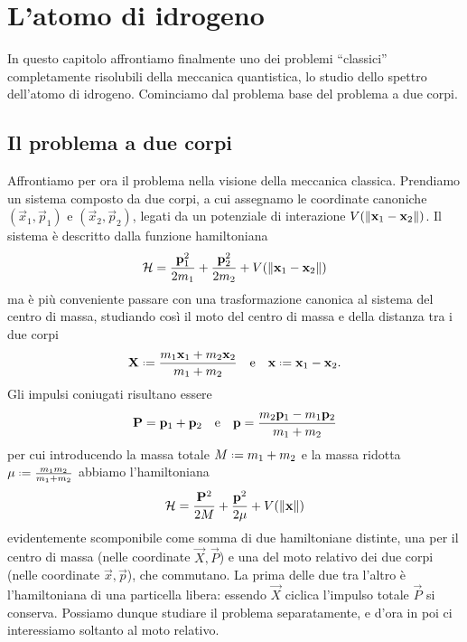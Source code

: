 \chapter{L'atomo di idrogeno}
In questo capitolo affrontiamo finalmente uno dei problemi ``classici'' completamente risolubili della meccanica quantistica, lo studio dello spettro dell'atomo di idrogeno.
Cominciamo dal problema base del problema a due corpi.

\section{Il problema a due corpi}
Affrontiamo per ora il problema nella visione della meccanica classica.
Prendiamo un sistema composto da due corpi, a cui assegnamo le coordinate canoniche $(\vec x_1,\vec p_1)$ e $(\vec x_2,\vec p_2)$, legati da un potenziale di interazione $V(\left\|{\mathbf{x}_1-\mathbf{x}_2}\right\|)$.
Il sistema è descritto dalla funzione hamiltoniana
\begin{equation}
	\mathcal H=\frac{\mathbf{p}_1^2}{2m_1}+\frac{\mathbf{p}_2^2}{2m_2}+V(\left\|{\mathbf{x}_1-\mathbf{x}_2}\right\|)
	\label{eq:hamiltoniana-due-corpi}
\end{equation}
ma è più conveniente passare con una trasformazione canonica al sistema del centro di massa, studiando cos\`i il moto del centro di massa e della distanza tra i due corpi
\begin{equation}
	\vec X\defeq\frac{m_1\vec x_1+m_2\vec x_2}{m_1+m_2}\qeq\vec x\defeq\vec x_1-\vec x_2.
	\label{eq:coordinate-moto-relativo}
\end{equation}
Gli impulsi coniugati risultano essere
\begin{equation}
	\mathbf{P}=\mathbf{p}_1+\mathbf{p}_2\quad\text{e}\quad\mathbf{p}=\frac{m_2\mathbf{p}_1-m_1\mathbf{p}_2}{m_1+m_2}
	\label{eq:impulsi-moto-relativo}
\end{equation}
per cui introducendo la massa totale $M\defeq m_1+m_2$ e la massa ridotta $\mu\defeq\frac{m_1m_2}{m_1+m_2}$ abbiamo l'hamiltoniana
\begin{equation}
	\mathcal H=\frac{\mathbf{P}^2}{2M}+\frac{\mathbf{p}^2}{2\mu}+V(\left\|{\mathbf{x}}\right\|)
	\label{eq:hamiltoniana-moto-relativo}
\end{equation}
evidentemente scomponibile come somma di due hamiltoniane distinte, una per il centro di massa (nelle coordinate $\vec X,\vec P$) e una del moto relativo dei due corpi (nelle coordinate $\vec x,\vec p$), che commutano.
La prima delle due tra l'altro è l'hamiltoniana di una particella libera: essendo $\vec X$ ciclica l'impulso totale $\vec P$ si conserva.
Possiamo dunque studiare il problema separatamente, e d'ora in poi ci interessiamo soltanto al moto relativo.
